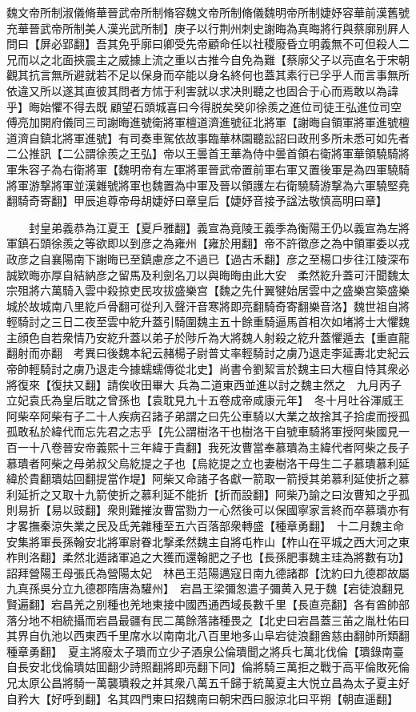 魏文帝所制淑儀脩華晉武帝所制脩容魏文帝所制脩儀魏明帝所制婕妤容華前漢舊號充華晉武帝所制美人漢光武所制】庚子以行荆州刺史謝晦為真晦將行與蔡廓别屛人問曰【屏必郢翻】吾其免乎廓曰卿受先帝顧命任以社稷廢昏立明義無不可但殺人二兄而以之北面挾震主之威據上流之重以古推今自免為難【蔡廓父子以亮直名于宋朝觀其抗言無所避就若不足以保身而卒能以身名終何也蓋其素行已孚乎人而言事無所依違又所以遂其直彼其問者方怵于利害就以求决則聽之也固合于心而焉敢以為諱乎】晦始懼不得去既顧望石頭城喜曰今得脱矣癸卯徐羨之進位司徒王弘進位司空傅亮加開府儀同三司謝晦進號衛將軍檀道濟進號征北將軍【謝晦自領軍將軍進號檀道濟自鎮北將軍進號】有司奏車駕依故事臨華林園聽訟詔曰政刑多所未悉可如先者二公推訊【二公謂徐羨之王弘】帝以王曇首王華為侍中曇首領右衛將軍華領驍騎將軍朱容子為右衛將軍【魏明帝有左軍將軍晉武帝置前軍右軍又置後軍是為四軍驍騎將軍游撃將軍並漢雜號將軍也魏置為中軍及晉以領護左右衛驍騎游撃為六軍驍堅堯翻騎奇寄翻】甲辰追尊帝母胡婕妤曰章皇后【婕妤音接予諡法敬慎高明曰章】

　　封皇弟義恭為江夏王【夏戶雅翻】義宣為竟陵王義季為衡陽王仍以義宣為左將軍鎮石頭徐羨之等欲即以到彦之為雍州【雍於用翻】帝不許徵彦之為中領軍委以戎政彦之自襄陽南下謝晦已至鎮慮彦之不過已【過古禾翻】彦之至楊口步往江陵深布誠欵晦亦厚自結納彦之留馬及利劍名刀以與晦晦由此大安　柔然紇升蓋可汗聞魏太宗殂將六萬騎入雲中殺掠吏民攻拔盛樂宫【魏之先什翼犍始居雲中之盛樂宫築盛樂城於故城南八里紇戶骨翻可從刋入聲汗音寒將即亮翻騎奇寄翻樂音洛】魏世祖自將輕騎討之三日二夜至雲中紇升蓋引騎圍魏主五十餘重騎逼馬首相次如堵將士大懼魏主顔色自若衆情乃安紇升蓋以弟子於陟斤為大將魏人射殺之紇升蓋懼遁去【重直龍翻射而亦翻　考異曰後魏本紀云赭楊子尉普丈率輕騎討之虜乃退走李延夀北史紀云帝帥輕騎討之虜乃退走今據蠕蠕傳從北史】尚書令劉絜言於魏主曰大檀自恃其衆必將復來【復扶又翻】請俟收田畢大兵為二道東西並進以討之魏主然之　九月丙子立妃袁氏為皇后耽之曾孫也【袁耽見九十五卷成帝咸康元年】　冬十月吐谷渾威王阿柴卒阿柴有子二十人疾病召諸子弟謂之曰先公車騎以大業之故捨其子拾䖍而授孤孤敢私於緯代而忘先君之志乎【先公謂樹洛干也樹洛干自號車騎將軍授阿柴國見一百一十八卷晉安帝義熙十三年緯于貴翻】我死汝曹當奉慕璝為主緯代者阿柴之長子慕璝者阿柴之母弟叔父烏紇提之子也【烏紇提之立也妻樹洛干母生二子慕璝慕利延緯於貴翻璝姑回翻提當作堤】阿柴又命諸子各獻一箭取一箭授其弟慕利延使折之慕利延折之又取十九箭使折之慕利延不能折【折而設翻】阿柴乃諭之曰汝曹知之乎孤則易折【易以豉翻】衆則難摧汝曹當勠力一心然後可以保國寧家言終而卒慕璝亦有才畧撫秦涼失業之民及氐羌雜種至五六百落部衆轉盛【種章勇翻】　十二月魏主命安集將軍長孫翰安北將軍尉眷北撃柔然魏主自將屯柞山【柞山在平城之西大河之東柞則洛翻】柔然北遁諸軍追之大獲而還翰肥之子也【長孫肥事魏主珪為將數有功】　詔拜營陽王母張氏為營陽太妃　林邑王范陽邁寇日南九德諸郡【沈約曰九德郡故屬九真孫吳分立九德郡隋唐為驩州】　宕昌王梁彌怱遣子彌黄入見于魏【宕徒浪翻見賢遍翻】宕昌羌之别種也羌地東接中國西通西域長數千里【長直亮翻】各有酋帥部落分地不相統攝而宕昌最疆有民二萬餘落諸種畏之【北史曰宕昌蓋三苖之胤杜佑曰其界自仇池以西東西千里席水以南南北八百里地多山阜宕徒浪翻酋慈由翻帥所類翻種章勇翻】　夏主將廢太子璝而立少子酒泉公倫璝聞之將兵七萬北伐倫【璝錄南臺自長安北伐倫璝姑囬翻少詩照翻將即亮翻下同】倫將騎三萬拒之戰于高平倫敗死倫兄太原公昌將騎一萬襲璝殺之并其衆八萬五千歸于統萬夏主大悦立昌為太子夏主好自矜大【好呼到翻】名其四門東曰招魏南曰朝宋西曰服涼北曰平朔【朝直遥翻】

